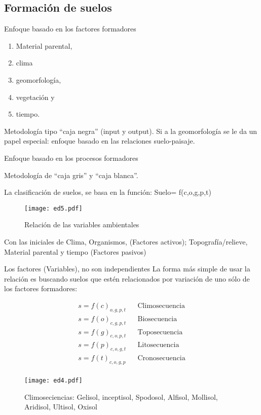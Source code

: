 \subsection{Formación de suelos}

Enfoque basado en los factores formadores
\begin{enumerate}
    \item Material parental, 
    \item clima
    \item geomorfología,
    \item vegetación y 
    \item tiempo.
\end{enumerate}

Metodología tipo ``caja negra'' (input y output). Si a la geomorfología se le da un papel especial: enfoque basado en las relaciones suelo-paisaje.

Enfoque basado en los procesos formadores

Metodología de ``caja gris'' y ``caja blanca''.

La clasificación de suelos, se basa en la función: Suelo= f(c,o,g,p,t)
\begin{figure}[h!]
\centering
  \texttt{[image: ed5.pdf]}
  \caption{Relación de las variables ambientales}
  \label{ed5}
\end{figure}
Con las iniciales de Clima, Organismos, (Factores activos); Topografía/relieve, Material parental y tiempo (Factores pasivos)

Los factores (Variables), no son independientes
La forma más simple de usar la relación es buscando suelos que estén relacionados por variación de uno sólo de los factores formadores:

\begin{align*}
    s=f(c)_{o,g,p,t}&&\text{Climosecuencia}\\
    s=f(o)_{c,g,p,t}&&\text{Biosecuencia}\\
    s=f(g)_{c,o,p,t}&&\text{Toposecuencia}\\
    s=f(p)_{c,o,g,t}&&\text{Litosecuencia}\\
    s=f(t)_{c,o,g,p}&&\text{Cronosecuencia}\\
\end{align*}

\begin{figure}[h!]
\centering
  \texttt{[image: ed4.pdf]}
  \caption{Climoseciencias: Gelisol, inceptisol, Spodosol, Alfisol, Mollisol, Aridisol, Ultisol, Oxisol}
  \label{ed4}
\end{figure}

